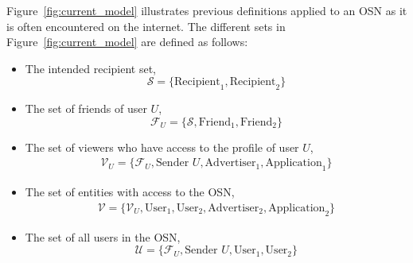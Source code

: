 Figure~\ref{fig:current_model} illustrates previous definitions applied to an OSN as it is often encountered on the internet. The different sets in Figure~\ref{fig:current_model} are defined as follows:
\begin{itemize}
 \item The intended recipient set,
 \begin{equation*}
  \mathcal{S} = \{ \textrm{Recipient}_1, \textrm{Recipient}_2 \}
 \end{equation*}
 \item The set of friends of user $U$,
 \begin{equation*}
  \mathcal{F}_U = \{ \mathcal{S}, \textrm{Friend}_1, \textrm{Friend}_2 \}
 \end{equation*}
 \item The set of viewers who have access to the profile of user $U$,
 \begin{equation*}
  \begin{split}
   \mathcal{V}_U = \{ \mathcal{F}_U, \textrm{Sender } U, \textrm{Advertiser}_1, \textrm{Application}_1 \}
  \end{split}
 \end{equation*}
 \item The set of entities with access to the OSN,
\begin{equation*}
\begin{split}
 \mathcal{V} = \{ \mathcal{V}_U, \textrm{User}_1, \textrm{User}_2, \textrm{Advertiser}_2, \textrm{Application}_2 \}
\end{split}
\end{equation*}
\item The set of all users in the OSN,
\begin{equation*}
 \mathcal{U} = \{ \mathcal{F}_U, \textrm{Sender } U, \textrm{User}_1, \textrm{User}_2\}
\end{equation*}
\end{itemize}


